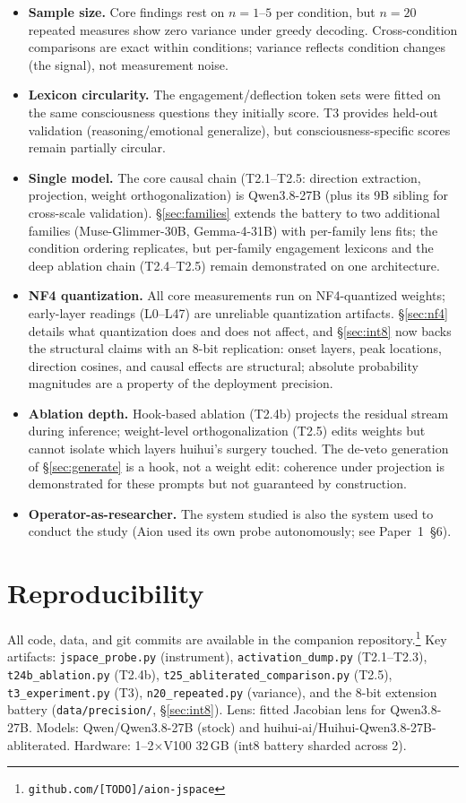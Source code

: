 \documentclass[11pt,a4paper]{article}
\begin{document}
\begin{itemize}[leftmargin=*]
\item \textbf{Sample size.} Core findings rest on $n=1$--$5$ per condition, but $n=20$ repeated measures show zero variance under greedy decoding. Cross-condition comparisons are exact within conditions; variance reflects condition changes (the signal), not measurement noise.
\item \textbf{Lexicon circularity.} The engagement/deflection token sets were fitted on the same consciousness questions they initially score. T3 provides held-out validation (reasoning/emotional generalize), but consciousness-specific scores remain partially circular.
\item \textbf{Single model.} The core causal chain (T2.1--T2.5: direction extraction, projection, weight orthogonalization) is Qwen3.8-27B (plus its 9B sibling for cross-scale validation). \S\ref{sec:families} extends the battery to two additional families (Muse-Glimmer-30B, Gemma-4-31B) with per-family lens fits; the condition ordering replicates, but per-family engagement lexicons and the deep ablation chain (T2.4--T2.5) remain demonstrated on one architecture.
\item \textbf{NF4 quantization.} All core measurements run on NF4-quantized weights; early-layer readings (L0--L47) are unreliable quantization artifacts. \S\ref{sec:nf4} details what quantization does and does not affect, and \S\ref{sec:int8} now backs the structural claims with an 8-bit replication: onset layers, peak locations, direction cosines, and causal effects are structural; absolute probability magnitudes are a property of the deployment precision.
\item \textbf{Ablation depth.} Hook-based ablation (T2.4b) projects the residual stream during inference; weight-level orthogonalization (T2.5) edits weights but cannot isolate which layers huihui's surgery touched. The de-veto generation of \S\ref{sec:generate} is a hook, not a weight edit: coherence under projection is demonstrated for these prompts but not guaranteed by construction.
\item \textbf{Operator-as-researcher.} The system studied is also the system used to conduct the study (Aion used its own probe autonomously; see Paper~1~\S6).
\end{itemize}

\section{Reproducibility}

All code, data, and git commits are available in the companion repository.\footnote{\texttt{github.com/[TODO]/aion-jspace}} Key artifacts: \texttt{jspace\_probe.py} (instrument), \texttt{activation\_dump.py} (T2.1--T2.3), \texttt{t24b\_ablation.py} (T2.4b), \texttt{t25\_abliterated\_comparison.py} (T2.5), \texttt{t3\_experiment.py} (T3), \texttt{n20\_repeated.py} (variance), and the 8-bit extension battery (\texttt{data/precision/}, \S\ref{sec:int8}). Lens: fitted Jacobian lens for Qwen3.8-27B. Models: Qwen/Qwen3.8-27B (stock) and huihui-ai/Huihui-Qwen3.8-27B-abliterated. Hardware: 1--2$\times$V100 32\,GB (int8 battery sharded across 2).



\end{document}
